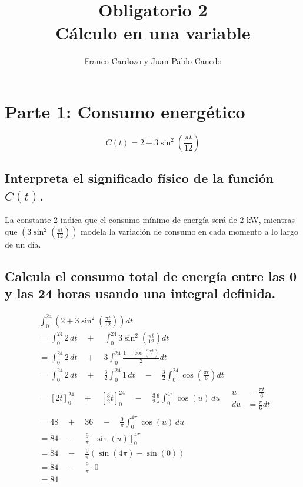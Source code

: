\documentclass[11pt, a4paper]{article}
\title{Obligatorio 2 \\ Cálculo en una variable}
\author{Franco Cardozo y Juan Pablo Canedo}
\date{}
\begin{document}
\maketitle
\clearpage

\section{Parte 1: Consumo energético}

$$C(t) = 2 + 3 \sin^2 \left(\frac{\pi t}{12}\right)$$


\subsection{Interpreta el significado físico de la función $C(t)$.}
La constante 2 indica que el consumo mínimo de energía será de 2 kW, mientras que $(3 \sin^2 \left(\frac{\pi t}{12}\right))$ modela la variación de consumo en cada momento a lo largo de un día.

\subsection{ Calcula el consumo total de energía entre las 0 y las 24 horas usando una integral definida.}

\begin{align*}
    & \int_{0}^{24} \left(2 + 3\sin^2\left(\frac{\pi t}{12}\right)\right) dt \\
    &= \int_{0}^{24} 2 \, dt \quad + \quad \int_{0}^{24} 3\sin^2\left(\frac{\pi t}{12}\right) dt \\
    &= \int_{0}^{24} 2 \, dt \quad + \quad 3\int_{0}^{24} \frac{1 - \cos\left(\frac{\pi t}{6}\right)}{2} dt \\
    &= \int_{0}^{24} 2 \, dt \quad + \quad \frac{3}{2}\int_{0}^{24} 1 \, dt \quad - \quad \frac{3}{2}\int_{0}^{24} \cos\left(\frac{\pi t}{6}\right) dt \\
    &= \left[2t\right]_{0}^{24} \quad + \quad \left[\frac{3}{2}t\right]_{0}^{24} \quad - \quad \frac{3}{2} \frac{6}{\pi} \int_{0}^{4\pi} \cos(u) \, du \quad
    \boxed{
        \begin{aligned}
            u &= \frac{\pi t}{6} \\
            du &= \frac{\pi}{6} dt
        \end{aligned}
    } \\
    &= 48 \quad + \quad 36 \quad - \quad \frac{9}{\pi} \int_{0}^{4\pi} \cos(u) \, du \\
    &= 84 \quad - \quad \frac{9}{\pi} \left[\sin(u)\right]_{0}^{4\pi} \\
    &= 84 \quad - \quad \frac{9}{\pi} (\sin(4\pi) - \sin(0)) \\
    &= 84 \quad - \quad \frac{9}{\pi} \cdot 0 \\
    &= \boxed{84}
\end{align*}
\end{document}
